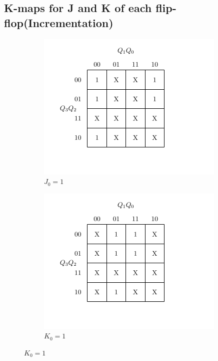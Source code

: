 \documentclass[a4paper,12pt]{article}
\begin{document}
\newpage
\subsection{K-maps for J and K of each flip-flop(Incrementation)}

\begin{figure}[H]
    \centering

    \begin{subfigure}[b]{0.45\textwidth}
        \centering
        \includegraphics[width=\linewidth]{inc/ij0.png}
        \caption{$J_0=1$}
    \end{subfigure}
    \hfill
    \begin{subfigure}[b]{0.45\textwidth}
        \centering
        \includegraphics[width=\linewidth]{inc/ik0.png}
        \caption{$K_0=1$}
    \end{subfigure}


\end{figure}
\end{document}
